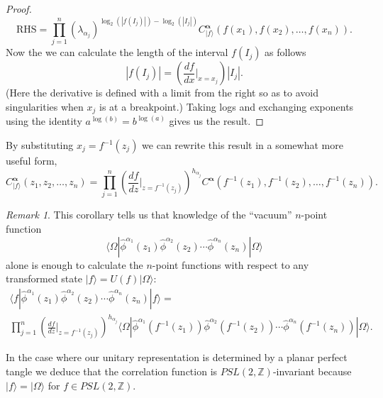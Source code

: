 \documentclass[11pt,oneside]{amsart}
\theoremstyle{plain}%
\newtheorem*{corollary}{Corollary}
\theoremstyle{definition}
\theoremstyle{remark}
\newtheorem*{remark}{Remark}
\begin{document}
\begin{proof}
	\begin{equation}
		\text{RHS} = \prod_{j=1}^n (\lambda_{\alpha_j})^{\log_2(|f(I_j)|)-\log_2(|I_j|)} C^{\boldsymbol{\alpha}}_{|f\rangle}(f(x_1), f(x_2), \ldots, f(x_n)).
	\end{equation}
	Now the we can calculate the length of the interval $f(I_j)$ as follows
	\begin{equation}
		|f(I_j)| = \left(\frac{df}{dx} \bigg|_{x = x_j}\right) |I_j|.
	\end{equation}
	(Here the derivative is defined with a limit from the right so as to avoid singularities when $x_j$ is at a breakpoint.)
	Taking logs and exchanging exponents using the identity $a^{\log(b)} = b^{\log(a)}$ gives us the result.
\end{proof}

By substituting $x_j = f^{-1}(z_j)$ we can rewrite this result in a somewhat more useful form,
	\begin{equation}\label{eq:nptaction2}
		C^{\boldsymbol{\alpha}}_{|f\rangle}(z_1, z_2, \ldots, z_n) = \prod_{j=1}^n \left(\frac{df}{dz}\bigg|_{z = f^{-1}(z_j)}\right)^{h_{\alpha_j}} C^{\boldsymbol{\alpha}}(f^{-1}(z_1), f^{-1}(z_2), \ldots, f^{-1}(z_n)).
	\end{equation}
\begin{remark}
	This corollary tells us that knowledge of the ``vacuum'' $n$-point function
	\begin{equation}
		\langle \Omega|\hat{\phi}^{\alpha_1}(z_1)\hat{\phi}^{\alpha_2}(z_2)\cdots \hat{\phi}^{\alpha_n}(z_n)|\Omega\rangle
	\end{equation}
	alone is enough to calculate the $n$-point functions with respect to any transformed state $|f\rangle = U(f)|\Omega\rangle$:
	\begin{multline}
		\langle f|\hat{\phi}^{\alpha_1}(z_1)\hat{\phi}^{\alpha_2}(z_2)\cdots \hat{\phi}^{\alpha_n}(z_n)|f\rangle = \\ \prod_{j=1}^n \left(\frac{df}{dz}\bigg|_{z = f^{-1}(z_j)}\right)^{h_{\alpha_j}}\langle \Omega|\hat{\phi}^{\alpha_1}(f^{-1}(z_1))\hat{\phi}^{\alpha_2}(f^{-1}(z_2))\cdots \hat{\phi}^{\alpha_n}(f^{-1}(z_n))|\Omega\rangle.
	\end{multline}
\end{remark}

In the case where our unitary representation is determined by a planar perfect tangle we deduce that the correlation function is $\mathit{PSL}(2,\mathbb{Z})$-invariant because $|f\rangle = |\Omega\rangle$ for $f\in\mathit{PSL}(2,\mathbb{Z})$.
\end{document}
